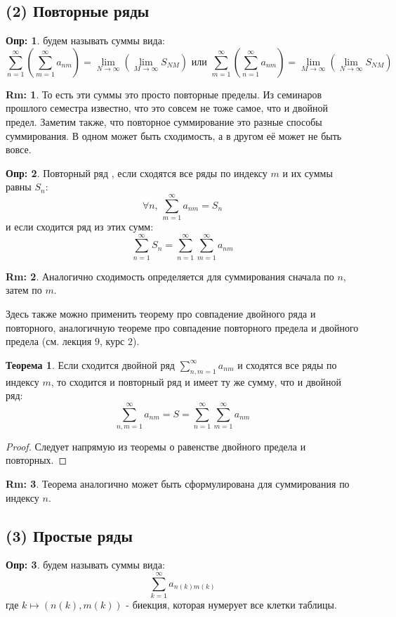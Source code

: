 \documentclass[12pt]{article}
\theoremstyle{definition}
\newtheorem{defn}{Опр:}
\newtheorem{rem}{Rm:}
\newtheorem{theorem}{Теорема}
\newcommand{\ddsum}[2]{\displaystyle\sum\limits_{#1}^{#2}}
\begin{document}
\subsection*{(2) Повторные ряды}
\begin{defn}
	 будем называть суммы вида:
	$$
		\ddsum{n = 1}{\infty}\left(\ddsum{m = 1}{\infty}a_{nm}\right) = \lim\limits_{N \to \infty}\left(\lim\limits_{M \to \infty} S_{NM}\right) \text{ или }\ddsum{m = 1}{\infty}\left(\ddsum{n = 1}{\infty}a_{nm}\right) = \lim\limits_{M \to \infty}\left(\lim\limits_{N \to \infty} S_{NM}\right)
	$$
\end{defn}
\begin{rem}
	То есть эти суммы это просто повторные пределы. Из семинаров прошлого семестра известно, что это совсем не тоже самое, что и двойной предел. Заметим также, что повторное суммирование это разные способы суммирования. В одном может быть сходимость, а в другом её может не быть вовсе.
\end{rem}
\begin{defn}
	Повторный ряд , если сходятся все ряды по индексу $m$ и их суммы равны $S_n$:
	$$
		\forall n, \, \ddsum{m = 1}{\infty}a_{nm} = S_n
	$$
	и если сходится ряд из этих сумм:
	$$
		\ddsum{n = 1}{\infty}S_n = \ddsum{n = 1}{\infty}\ddsum{m = 1}{\infty}a_{nm}
	$$
\end{defn}
\begin{rem}
	Аналогично сходимость определяется для суммирования сначала по $n$, затем по $m$.
\end{rem}
Здесь также можно применить теорему про совпадение двойного ряда и повторного, аналогичную теореме про совпадение повторного предела и двойного предела (см. лекция $9$, курс $2$).
\begin{theorem}
	Если сходится двойной ряд $\ddsum{n,m = 1}{\infty}a_{nm}$ и сходятся все ряды по индексу $m$, то сходится и повторный ряд и имеет ту же сумму, что и двойной ряд:
	$$
		\ddsum{n,m = 1}{\infty}a_{nm} = S = \ddsum{n = 1}{\infty}\ddsum{m = 1}{\infty}a_{nm}
	$$
\end{theorem}
\begin{proof}
	Следует напрямую из теоремы о равенстве двойного предела и повторных.
\end{proof}
\begin{rem}
	Теорема аналогично может быть сформулирована для суммирования по индексу $n$.
\end{rem}
\subsection*{(3) Простые ряды}
\begin{defn}
	 будем называть суммы вида:
	$$
		\ddsum{k = 1}{\infty}a_{n(k)m(k)}
	$$
	где $k \mapsto (n(k), m(k))$ - биекция, которая нумерует все клетки таблицы.
\end{defn}
\end{document}
